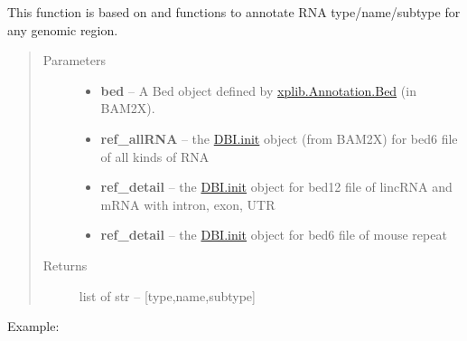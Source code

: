 \documentclass[letterpaper,10pt,english]{sphinxmanual}
\begin{document}

\begin{fulllineitems}
\label{Other_api:Annotation.annotation}
This function is based on {\hyperref[Other_api:Annotation.overlap]{}} and {\hyperref[Other_api:Annotation.Subtype]{}} functions to annotate RNA type/name/subtype for any genomic region.
\begin{quote}\begin{description}
\item[{Parameters}] \leavevmode\begin{itemize}
\item {} 
\textbf{bed} -- 
A Bed object defined by \href{http://bam2xwiki.appspot.com/bed}{xplib.Annotation.Bed} (in BAM2X).


\item {} 
\textbf{ref\_allRNA} -- the \href{http://bam2xwiki.appspot.com/DBI}{DBI.init} object (from BAM2X) for bed6 file of all kinds of RNA

\item {} 
\textbf{ref\_detail} -- 
the \href{http://bam2xwiki.appspot.com/DBI}{DBI.init} object for bed12 file of lincRNA and mRNA with intron, exon, UTR


\item {} 
\textbf{ref\_detail} -- 
the \href{http://bam2xwiki.appspot.com/DBI}{DBI.init} object for bed6 file of mouse repeat


\end{itemize}

\item[{Returns}] \leavevmode
list of str -- {[}type,name,subtype{]}

\end{description}\end{quote}

Example:


\end{fulllineitems}
\end{document}
